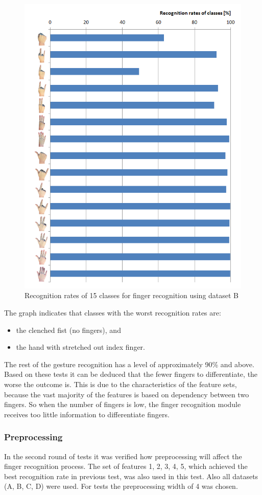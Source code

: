 \begin{figure}[htb]
\centering
 \includegraphics[width=0.75\columnwidth]{figures/classRateFD.png}
 \caption{Recognition rates of 15 classes for finger recognition using dataset B}
 \label{classRateFD}
\end{figure}

The graph indicates that classes with the worst recognition rates are:
\begin{itemize}
\item the clenched fist (no fingers), and
\item the hand with stretched out index finger.
\end{itemize}
The rest of the gesture recognition has a level of approximately 90\% and above. Based on these tests it can be deduced that the fewer fingers to differentiate, the worse the outcome is. This is due to the characteristics of the feature sets, because the vast majority of the features is based on dependency between two fingers. So when the number of fingers is low, the finger recognition module receives too little information to differentiate fingers.



\subsubsection*{Preprocessing}
In the second round of tests it was verified how preprocessing will affect the finger recognition process. The set of features 1, 2, 3, 4, 5, which achieved the best recognition rate in previous test, was also used in this test. Also all datasets (A, B, C, D) were used. For tests the preprocessing width of 4 was chosen.

